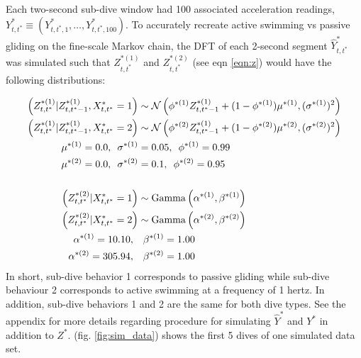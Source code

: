 Each two-second sub-dive window had 100 associated acceleration readings, $Y^*_{t,t^*} \equiv \left(Y^*_{t,t^*,1}, \ldots, Y^*_{t,t^*,100}\right)$. To accurately recreate active swimming vs passive gliding on the fine-scale Markov chain, the DFT of each 2-second segment $\hat Y^*_{t,t^*}$ was simulated such that $Z^{*(1)}_{t,t^*}$ and $Z^{*(2)}_{t,t^*}$ (see eqn \ref{eqn:z}) would have the following distributions: 

\begin{align*}
    \left(Z^{*(1)}_{t,t^*} | Z^{*(1)}_{t,t^*-1}, X^*_{t,t^*} = 1 \right) &\sim \mathcal{N} \left(\phi^{*(1)}Z^{*(1)}_{t,t^*-1} + (1-\phi^{*(1)})\mu^{*(1)}, (\sigma^{*(1)})^2 \right) \\
    \left(Z^{*(1)}_{t,t^*} | Z^{*(1)}_{t,t^*-1}, X^*_{t,t^*} = 2 \right) &\sim \mathcal{N} \left(\phi^{*(2)}Z^{*(1)}_{t,t^*-1} + (1-\phi^{*(2)})\mu^{*(2)}, (\sigma^{*(2)})^2 \right) \\
    \mu^{*(1)} = 0.0,\enspace \sigma^{*(1)} &= 0.05,\enspace \phi^{*(1)} = 0.99 \\
    \mu^{*(2)} = 0.0,\enspace \sigma^{*(2)} &= 0.1,\enspace \phi^{*(2)} = 0.95 \\\\
    \left(Z^{*(2)}_{t,t^*} | X^*_{t,t^*} = 1\right) &\sim {\rm{Gamma}}\left(\alpha^{*(1)}, \beta^{*(1)} \right) \\
    \left(Z^{*(2)}_{t,t^*} | X^*_{t,t^*} = 2\right) &\sim {\rm{Gamma}}\left(\alpha^{*(2)}, \beta^{*(2)} \right) \\
    \alpha^{*(1)} = 10.10, \enspace & \enspace \beta^{*(1)} = 1.00 \\
    \alpha^{*(2)} = 305.94, \enspace & \enspace \beta^{*(2)} = 1.00
\end{align*}
%
In short, sub-dive behavior 1 corresponds to passive gliding while sub-dive behaviour 2 corresponds to active swimming at a frequency of 1 hertz. In addition, sub-dive behaviors 1 and 2 are the same for both dive types. See the appendix for more details regarding procedure for simulating $\hat Y^*$ and $Y^*$ in addition to $Z^*$. (fig. \ref{fig:sim_data}) shows the first 5 dives of one simulated data set.

